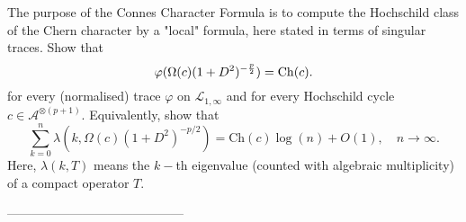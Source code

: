 \documentclass{article}
\begin{document}
 The purpose of the Connes Character Formula is to compute the Hochschild class of the Chern character by a "local" formula, here stated in terms of singular traces. Show that
\begin{equation}\label{super main eq}
\varphi(\Omega(c)(1+D^2)^{-\frac{p}{2}})={\rm Ch}(c).
\end{equation}
for every (normalised) trace $\varphi$ on $\mathcal{L}_{1,\infty}$ and for every Hochschild cycle $c\in\mathcal{A}^{\otimes (p+1)}.$ Equivalently, show that
$$\sum_{k=0}^n \lambda(k,\Omega(c)(1+D^2)^{-p/2}) = \mathrm{Ch}(c)\log(n)+O(1),\quad n\to\infty.$$
Here, $\lambda(k,T)$ means the $k-$th eigenvalue (counted with algebraic multiplicity) of a compact operator $T.$

------------------------------------------
\end{document}
